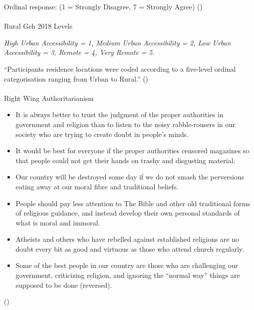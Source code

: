 \documentclass[
  single column]{article}
\makeatletter
\let\oldparagraph\paragraph
\renewcommand{\paragraph}{
    \@ifstar
      \xxxParagraphStar
      \xxxParagraphNoStar
  }
\newcommand{\xxxParagraphStar}[1]{\oldparagraph*{#1}\mbox{}}
\newcommand{\xxxParagraphNoStar}[1]{\oldparagraph{#1}\mbox{}}
\providecommand{\tightlist}{%
  \setlength{\itemsep}{0pt}\setlength{\parskip}{0pt}}\usepackage{longtable,booktabs,array}
\makeatother
\begin{document}
Ordinal response: (1 = Strongly Disagree, 7 = Strongly Agree)
()

\paragraph{Rural Gch 2018 Levels}\label{rural-gch-2018-levels}

\emph{High Urban Accessibility = 1, Medium Urban Accessibility = 2, Low
Urban Accessibility = 3, Remote = 4, Very Remote = 5.}

``Participants residence locations were coded according to a five-level
ordinal categorisation ranging from Urban to Rural.''
()

\paragraph{Right Wing
Authoritarianism}\label{right-wing-authoritarianism}

\begin{itemize}
\tightlist
\item
  It is always better to trust the judgment of the proper authorities in
  government and religion than to listen to the noisy rabble-rousers in
  our society who are trying to create doubt in people's minds.
\item
  It would be best for everyone if the proper authorities censored
  magazines so that people could not get their hands on trashy and
  disgusting material.
\item
  Our country will be destroyed some day if we do not smash the
  perversions eating away at our moral fibre and traditional beliefs.
\item
  People should pay less attention to The Bible and other old
  traditional forms of religious guidance, and instead develop their own
  personal standards of what is moral and immoral.
\item
  Atheists and others who have rebelled against established religions
  are no doubt every bit as good and virtuous as those who attend church
  regularly.
\item
  Some of the best people in our country are those who are challenging
  our government, criticizing religion, and ignoring the ``normal way''
  things are supposed to be done (reversed).
\end{itemize}

()
\end{document}
